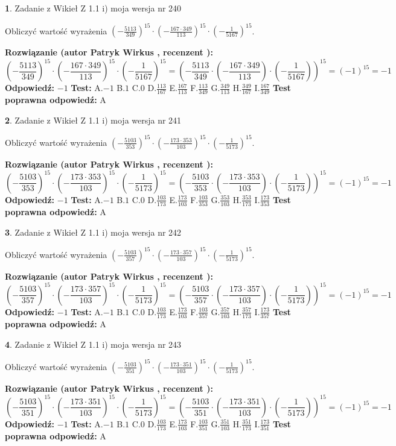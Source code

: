 \documentclass[12pt, a4paper]{article}
\theoremstyle{definition} %
\newtheorem{zad}{}
\newcommand{\zadStart}[1]{\begin{zad}#1\newline}
\newcommand{\zadStop}{\end{zad}}
\newcommand{\rozwStart}[2]{\noindent \textbf{Rozwiązanie (autor #1 , recenzent #2): }\newline}
\newcommand{\rozwStop}{\newline}
\newcommand{\odpStart}{\noindent \textbf{Odpowiedź:}\newline}
\newcommand{\odpStop}{\newline}
\newcommand{\testStart}{\noindent \textbf{Test:}\newline}
\newcommand{\testStop}{\newline}
\newcommand{\kluczStart}{\noindent \textbf{Test poprawna odpowiedź:}\newline}
\newcommand{\kluczStop}{\newline}
\begin{document}
\zadStart{Zadanie z Wikieł Z 1.1 i) moja wersja nr 240}

Obliczyć wartość wyrażenia $(-\frac{5113}{349})^{15} \cdot (-\frac{167 \cdot 349}{113})^{15} \cdot (-\frac{1}{5167})^{15}$.
\zadStop
\rozwStart{Patryk Wirkus}{}
$$(-\frac{5113}{349})^{15} \cdot (-\frac{167 \cdot 349}{113})^{15} \cdot (-\frac{1}{5167})^{15} = (-\frac{5113}{349} \cdot (-\frac{167 \cdot 349}{113}) \cdot (-\frac{1}{5167}))^{15} = (-1)^{15} = -1$$
\rozwStop
\odpStart
$-1$
\odpStop
\testStart
A.$-1$ B.$1$ C.$0$ D.$\frac{113}{167}$ E.$\frac{167}{113}$
F.$\frac{113}{349}$ G.$\frac{349}{113}$
H.$\frac{349}{167}$
I.$\frac{167}{349}$
\testStop
\kluczStart
A
\kluczStop



\zadStart{Zadanie z Wikieł Z 1.1 i) moja wersja nr 241}

Obliczyć wartość wyrażenia $(-\frac{5103}{353})^{15} \cdot (-\frac{173 \cdot 353}{103})^{15} \cdot (-\frac{1}{5173})^{15}$.
\zadStop
\rozwStart{Patryk Wirkus}{}
$$(-\frac{5103}{353})^{15} \cdot (-\frac{173 \cdot 353}{103})^{15} \cdot (-\frac{1}{5173})^{15} = (-\frac{5103}{353} \cdot (-\frac{173 \cdot 353}{103}) \cdot (-\frac{1}{5173}))^{15} = (-1)^{15} = -1$$
\rozwStop
\odpStart
$-1$
\odpStop
\testStart
A.$-1$ B.$1$ C.$0$ D.$\frac{103}{173}$ E.$\frac{173}{103}$
F.$\frac{103}{353}$ G.$\frac{353}{103}$
H.$\frac{353}{173}$
I.$\frac{173}{353}$
\testStop
\kluczStart
A
\kluczStop



\zadStart{Zadanie z Wikieł Z 1.1 i) moja wersja nr 242}

Obliczyć wartość wyrażenia $(-\frac{5103}{357})^{15} \cdot (-\frac{173 \cdot 357}{103})^{15} \cdot (-\frac{1}{5173})^{15}$.
\zadStop
\rozwStart{Patryk Wirkus}{}
$$(-\frac{5103}{357})^{15} \cdot (-\frac{173 \cdot 357}{103})^{15} \cdot (-\frac{1}{5173})^{15} = (-\frac{5103}{357} \cdot (-\frac{173 \cdot 357}{103}) \cdot (-\frac{1}{5173}))^{15} = (-1)^{15} = -1$$
\rozwStop
\odpStart
$-1$
\odpStop
\testStart
A.$-1$ B.$1$ C.$0$ D.$\frac{103}{173}$ E.$\frac{173}{103}$
F.$\frac{103}{357}$ G.$\frac{357}{103}$
H.$\frac{357}{173}$
I.$\frac{173}{357}$
\testStop
\kluczStart
A
\kluczStop



\zadStart{Zadanie z Wikieł Z 1.1 i) moja wersja nr 243}

Obliczyć wartość wyrażenia $(-\frac{5103}{351})^{15} \cdot (-\frac{173 \cdot 351}{103})^{15} \cdot (-\frac{1}{5173})^{15}$.
\zadStop
\rozwStart{Patryk Wirkus}{}
$$(-\frac{5103}{351})^{15} \cdot (-\frac{173 \cdot 351}{103})^{15} \cdot (-\frac{1}{5173})^{15} = (-\frac{5103}{351} \cdot (-\frac{173 \cdot 351}{103}) \cdot (-\frac{1}{5173}))^{15} = (-1)^{15} = -1$$
\rozwStop
\odpStart
$-1$
\odpStop
\testStart
A.$-1$ B.$1$ C.$0$ D.$\frac{103}{173}$ E.$\frac{173}{103}$
F.$\frac{103}{351}$ G.$\frac{351}{103}$
H.$\frac{351}{173}$
I.$\frac{173}{351}$
\testStop
\kluczStart
A
\kluczStop
\end{document}
